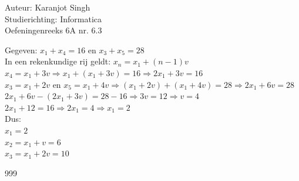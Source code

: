 \documentclass[a4paper]{article}
\begin{document}
	
\noindent \large Auteur: Karanjot Singh\\
\noindent \large Studierichting: Informatica\\
\noindent \large Oefeningenreeks 6A nr. 6.3\\

\normalsize

Gegeven: $x_1 + x_4 = 16$ en $x_3 + x_5 = 28$\\

In een rekenkundige rij geldt: $x_n = x_1 + (n - 1)v$\\

$x_4 = x_1 + 3v \Rightarrow x_1 + (x_1 + 3v) = 16 \Rightarrow 2x_1 + 3v = 16$\\

$x_3 = x_1 + 2v$ en $x_5 = x_1 + 4v \Rightarrow (x_1 + 2v) + (x_1 + 4v) = 28 \Rightarrow 2x_1 + 6v = 28$\\

$2x_1 + 6v - (2x_1 + 3v) = 28 - 16 \Rightarrow 3v = 12 \Rightarrow v = 4$\\

$2x_1 + 12 = 16 \Rightarrow 2x_1 = 4 \Rightarrow x_1 = 2$\\

Dus:\\

$x_1 = 2$\\

$x_2 = x_1 + v = 6$\\

$x_3 = x_1 + 2v = 10$\\

\begin{thebibliography}{999}
\end{thebibliography}
\end{document}
